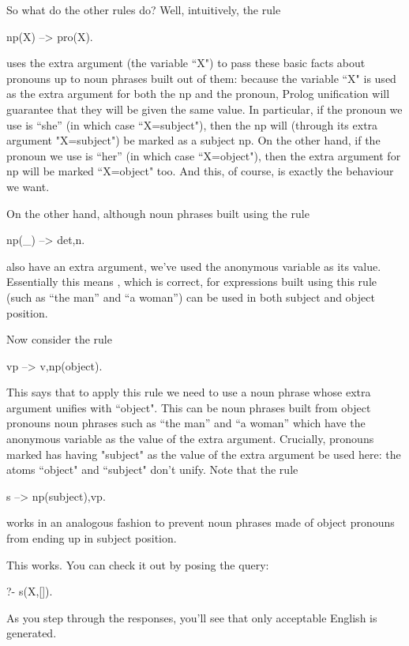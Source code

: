 So what do the other rules do? Well, intuitively, the rule
\begin{LPNcodedisplay}
np(X) --> pro(X).
\end{LPNcodedisplay}
uses the extra argument (the variable ``X") to pass these basic facts
about pronouns up to noun phrases built out of them: because the
variable ``X" is used as the extra argument for both the np and the
pronoun, Prolog unification will guarantee that they will be given the
same value. In particular, if the pronoun we use is ``she'' (in which
case ``X=subject"), then the np will (through its extra argument
"X=subject") be marked as a subject np. On the other hand, if the
pronoun we use is ``her'' (in which case ``X=object"), then the extra
argument for np will be marked ``X=object" too. And this, of course, is
exactly the behaviour we want.

On the other hand, although noun phrases built using the rule
\begin{LPNcodedisplay}
np(_) --> det,n.
\end{LPNcodedisplay}
also have an extra argument, we've used the anonymous variable as its
value.  Essentially this means , which is
correct, for expressions built using this rule (such as ``the man''
and ``a woman'') can be used in both subject and object position.

Now consider the rule
\begin{LPNcodedisplay}
vp --> v,np(object).
\end{LPNcodedisplay}
This says that to apply this rule we need to use a noun phrase whose
extra argument unifies with ``object".  This can be 
noun phrases built from object pronouns  noun phrases such as
``the man'' and ``a woman'' which have the anonymous variable as the
value of the extra argument.  Crucially, pronouns marked has having
"subject" as the value of the extra argument  be used
here: the atoms ``object" and ``subject" don't unify.  Note
that the rule
\begin{LPNcodedisplay}
s --> np(subject),vp.
\end{LPNcodedisplay}
works in an analogous fashion to prevent noun phrases made of object
pronouns from ending up in subject position.

This works.  You can check it out by posing the query:
\begin{LPNcodedisplay}
?- s(X,[]).
\end{LPNcodedisplay}
As you step through the responses, you'll see that only acceptable
English is generated.

